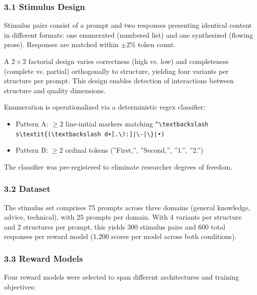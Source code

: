 
\subsubsection{3.1 Stimulus Design}

Stimulus pairs consist of a prompt and two responses presenting identical content in different formats: one enumerated (numbered list) and one synthesized (flowing prose). Responses are matched within $\pm 2$\% token count.

A $2\times 2$ factorial design varies correctness (high vs. low) and completeness (complete vs. partial) orthogonally to structure, yielding four variants per structure per prompt. This design enables detection of interactions between structure and quality dimensions.

Enumeration is operationalized via a deterministic regex classifier:
\begin{itemize}
\item Pattern A: $\geq 2$ line-initial markers matching \texttt{\^{}\textbackslash textbackslash s\textbackslash textit\{(\textbackslash textbackslash d+[.\textbackslash ):]|\textbackslash -|\textbackslash \}|•)}
\item Pattern B: $\geq 2$ ordinal tokens (''First,'', ''Second,'', ''1.'', ''2.'')
\end{itemize}

The classifier was pre-registered to eliminate researcher degrees of freedom.

\subsubsection{3.2 Dataset}

The stimulus set comprises 75 prompts across three domains (general knowledge, advice, technical), with 25 prompts per domain. With 4 variants per structure and 2 structures per prompt, this yields 300 stimulus pairs and 600 total responses per reward model (1,200 scores per model across both conditions).

\subsubsection{3.3 Reward Models}

Four reward models were selected to span different architectures and training objectives:

\begin{table}[htbp]
\centering
{}
\end{table}

